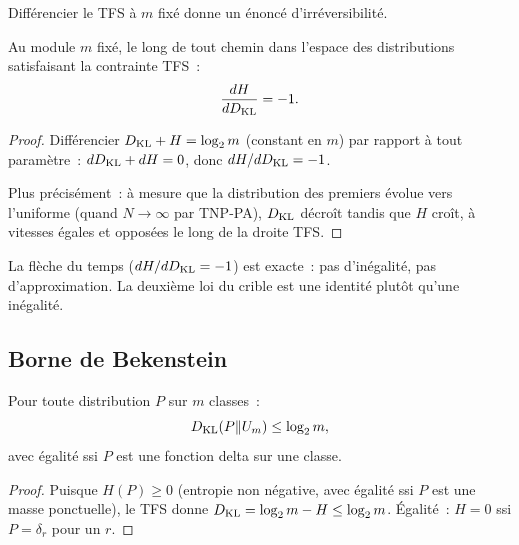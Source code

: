 \documentclass[12pt,a4paper]{article}
\begin{document}
Différencier le TFS à $m$ fixé donne un énoncé d'irréversibilité.

\mID
\begin{idbox}
\label{id:arrow}
Au module $m$ fixé, le long de tout chemin dans l'espace des
distributions satisfaisant la contrainte TFS~:
\begin{equation}
  \frac{dH}{dD_{\mathrm{KL}}} = -1.
  \label{eq:arrow}
\end{equation}

\begin{proof}
Différencier $D_{\mathrm{KL}} + H = \log_2 m$ (constant en $m$) par rapport à
tout paramètre~: $dD_{\mathrm{KL}} + dH = 0$, donc $dH/dD_{\mathrm{KL}} = -1$.

Plus précisément~: à mesure que la distribution des premiers évolue
vers l'uniforme (quand $N \to \infty$ par TNP-PA), $D_{\mathrm{KL}}$ décroît
tandis que $H$ croît, à vitesses égales et opposées le long de la
droite TFS.
\end{proof}
\end{idbox}

\begin{remarque}
La flèche du temps ($dH/dD_{\mathrm{KL}} = -1$) est exacte~: pas d'inégalité,
pas d'approximation. La deuxième loi du crible est une identité
plutôt qu'une inégalité.
\end{remarque}

\subsection{Borne de Bekenstein}
\label{sec:bekenstein}

\mTHM
\begin{theoreme}
\label{thm:bekenstein}
Pour toute distribution $P$ sur $m$ classes~:
\begin{equation}
  D_{\mathrm{KL}}(P\|U_m) \leq \log_2 m,
  \label{eq:bekenstein}
\end{equation}
avec égalité ssi $P$ est une fonction delta sur une classe.

\begin{proof}
Puisque $H(P) \geq 0$ (entropie non négative, avec égalité ssi $P$
est une masse ponctuelle), le TFS donne
$D_{\mathrm{KL}} = \log_2 m - H \leq \log_2 m$. Égalité~: $H = 0$ ssi
$P = \delta_r$ pour un $r$.
\end{proof}
\end{theoreme}

\end{document}
